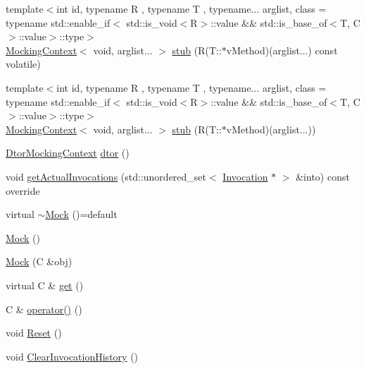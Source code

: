\begin{DoxyCompactItemize}
\item 
{\footnotesize template$<$int id, typename R , typename T , typename... arglist, class  = typename std\+::enable\+\_\+if$<$                std\+::is\+\_\+void$<$\+R$>$\+::value \&\& std\+::is\+\_\+base\+\_\+of$<$\+T, C$>$\+::value$>$\+::type$>$ }\\\mbox{\hyperlink{classfakeit_1_1MockingContext}{Mocking\+Context}}$<$ void, arglist... $>$ \mbox{\hyperlink{classfakeit_1_1Mock_a22b83b574e4db2689c8a1f3375554035}{stub}} (R(T\+::$\ast$v\+Method)(arglist...) const volatile)
\item 
{\footnotesize template$<$int id, typename R , typename T , typename... arglist, class  = typename std\+::enable\+\_\+if$<$                std\+::is\+\_\+void$<$\+R$>$\+::value \&\& std\+::is\+\_\+base\+\_\+of$<$\+T, C$>$\+::value$>$\+::type$>$ }\\\mbox{\hyperlink{classfakeit_1_1MockingContext}{Mocking\+Context}}$<$ void, arglist... $>$ \mbox{\hyperlink{classfakeit_1_1Mock_aeedcaacc82d12295f11c3fc454b75554}{stub}} (R(T\+::$\ast$v\+Method)(arglist...))
\item 
\mbox{\hyperlink{classfakeit_1_1DtorMockingContext}{Dtor\+Mocking\+Context}} \mbox{\hyperlink{classfakeit_1_1Mock_a5c25c5db6e0e1b955137a1330f7348b9}{dtor}} ()
\item 
void \mbox{\hyperlink{classfakeit_1_1Mock_a107ca653b36eb6f72bf9d5acb13c26d8}{get\+Actual\+Invocations}} (std\+::unordered\+\_\+set$<$ \mbox{\hyperlink{structfakeit_1_1Invocation}{Invocation}} $\ast$ $>$ \&into) const override
\item 
virtual \mbox{\hyperlink{classfakeit_1_1Mock_af5ecff29779ab75289c260d0a56705ab}{$\sim$\+Mock}} ()=default
\item 
\mbox{\hyperlink{classfakeit_1_1Mock_af7a86c609a2ee704ee09de6db066c7f4}{Mock}} ()
\item 
\mbox{\hyperlink{classfakeit_1_1Mock_aa474a0d6c7447608253a0fc306eb6ef5}{Mock}} (C \&obj)
\item 
virtual C \& \mbox{\hyperlink{classfakeit_1_1Mock_a139a126982e65ed43a69b21a3a8a6d35}{get}} ()
\item 
C \& \mbox{\hyperlink{classfakeit_1_1Mock_a128ca35e5c7648e0612f017cb7076498}{operator()}} ()
\item 
void \mbox{\hyperlink{classfakeit_1_1Mock_a69c66fc56c032205843b05d91f339a55}{Reset}} ()
\item 
void \mbox{\hyperlink{classfakeit_1_1Mock_ac9e21ef9c73c735287c7fd3dd110aafc}{Clear\+Invocation\+History}} ()
\item 

\end{DoxyCompactItemize}
